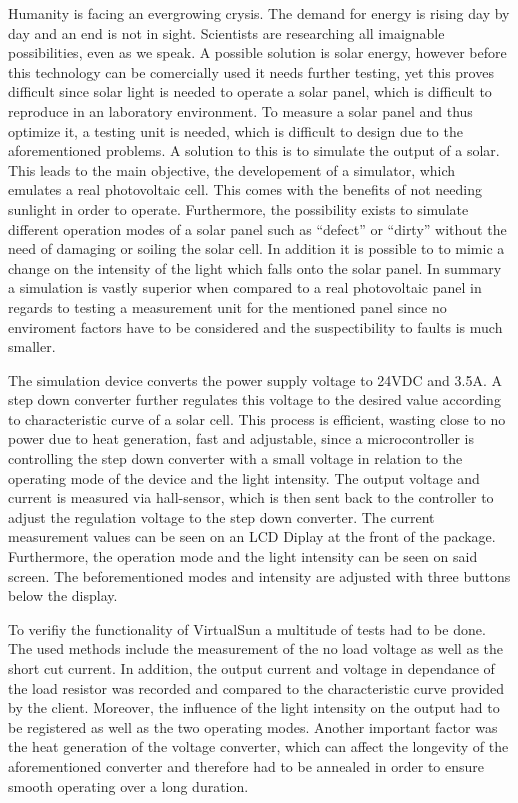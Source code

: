 \documentclass[a4paper]{fhnwreport}
\begin{document}
Humanity is facing an evergrowing crysis. The demand for energy is rising day by day and an end is not in sight. Scientists are researching all imaignable possibilities, even as we speak. A possible solution is solar energy, however before this technology can be comercially used it needs further testing, yet this proves difficult since solar light is needed to operate a solar panel, which is difficult to reproduce in an laboratory environment. To measure a solar panel and thus optimize it, a testing unit is needed, which is difficult to design due to the aforementioned problems. A solution to this is to simulate the output of a solar. This leads to the main objective, the developement of a simulator, which emulates a real photovoltaic cell. This comes with the benefits of not needing sunlight in order to operate. Furthermore, the possibility exists to simulate different operation modes of a solar panel such as ``defect'' or ``dirty'' without the need of damaging or soiling the solar cell. In addition it is possible to to mimic a change on the intensity of the light which falls onto the solar panel. In summary a simulation is vastly superior when compared to a real photovoltaic panel in regards to testing a measurement unit for the mentioned panel
since no enviroment factors have to be considered and the suspectibility to faults is much smaller. 

The simulation device converts the power supply voltage to 24VDC and 3.5A. A step down converter further regulates this voltage to the desired value according to characteristic curve of a solar cell. This process is efficient, wasting close to no power due to heat generation, fast and adjustable, since a microcontroller is controlling the step down converter with a small voltage in relation to the operating mode of the device and the light intensity. The output voltage and current is measured via hall-sensor, which is then sent back to the controller to adjust the regulation voltage to the step down converter. The current measurement values can be seen on an LCD Diplay at the front of the package. Furthermore, the operation mode and the light intensity can be seen on said screen. The beforementioned modes and intensity are adjusted with three buttons below the display. 

To verifiy the functionality of VirtualSun a multitude of tests had to be done. The used methods include the measurement of the no load voltage as well as the short cut current. In addition, the output current and voltage in dependance of the load resistor was recorded and compared to the characteristic curve provided by the client.  Moreover, the influence of the light intensity on the output had to be registered as well as the two operating modes. Another important factor was the heat generation of the voltage converter, which can affect the longevity of the aforementioned converter and therefore had to be annealed in order to ensure smooth operating over a long duration. 

 
\end{document}
